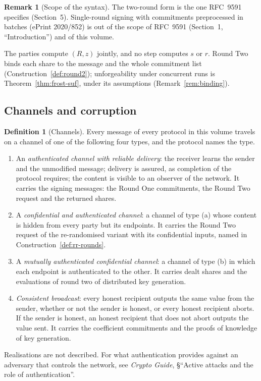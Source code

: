 \documentclass[11pt,a4paper]{article}
\theoremstyle{definition}
\newtheorem{definition}[theorem]{Definition}
\newtheorem{remark}[theorem]{Remark}
\begin{document}
\begin{remark}[Scope of the syntax]
The two-round form is the one RFC~9591 specifies (Section~5). Single-round
signing with commitments preprocessed in batches (ePrint 2020/852) is out of
the scope of RFC~9591 (Section~1, ``Introduction'') and of this volume.
\end{remark}

The parties compute \((R, z)\) jointly, and no step computes \(s\) or \(r\).
Round Two binds each share to the message and the whole commitment list
(Construction~\ref{def:round2}); unforgeability under concurrent runs is
Theorem~\ref{thm:frost-suf}, under its assumptions
(Remark~\ref{rem:binding}).

\subsection{Channels and corruption}\label{sec:ts-model}

\begin{definition}[Channels]\label{def:channels}
Every message of every protocol in this volume travels on a channel of one
of the following four types, and the protocol names the type.
\begin{enumerate}
\item[(a)] An \emph{authenticated channel with reliable delivery}: the
  receiver learns the sender and the unmodified message; delivery is
  assured, as completion of the protocol requires; the content is visible
  to an observer of the network. It carries the signing messages: the
  Round One commitments, the Round Two request and the returned shares.
\item[(b)] A \emph{confidential and authenticated channel}: a channel of
  type (a) whose content is hidden from every party but its endpoints. It
  carries the Round Two request of the re-randomised variant with its
  confidential inputs, named in Construction~\ref{def:rr-rounds}.
\item[(c)] A \emph{mutually authenticated confidential channel}: a channel
  of type (b) in which each endpoint is authenticated to the other. It
  carries dealt shares and the evaluations of round two of distributed key
  generation.
\item[(d)] \emph{Consistent broadcast}: every honest recipient outputs the
  same value from the sender, whether or not the sender is honest, or every
  honest recipient aborts. If the sender is honest, an honest recipient
  that does not abort outputs the value sent. It carries the coefficient
  commitments and the
  proofs of knowledge of key generation.
\end{enumerate}
Realisations are not described. For what authentication provides against
an adversary that controls the network, see \emph{Crypto Guide},
\S``Active attacks and the role of authentication''.
\end{definition}
\end{document}
